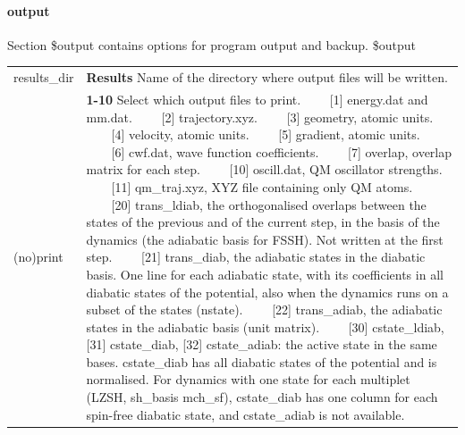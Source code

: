 \documentclass{report}
\newcommand{\tabitem}{~~\llap{--}~~}
\begin{document}
\paragraph{output}
Section \$output contains options for program output and backup. \newline
\$output

\begin{tabularx}{\textwidth}{ m{2.5cm} X }
results\_dir &
	\textbf{Results} \newline
	Name of the directory where output files will be written. \\

(no)print		&
	\textbf{1-10} \newline
	Select which output files to print. \newline
	\tabitem [1]   energy.dat and mm.dat. \newline
	\tabitem [2]   trajectory.xyz. \newline
	\tabitem [3]   geometry, atomic units. \newline
	\tabitem [4]   velocity, atomic units. \newline
	\tabitem [5]   gradient, atomic units. \newline
	\tabitem [6]   cwf.dat, wave function coefficients. \newline
	\tabitem [7]   overlap, overlap matrix for each step. \newline
	\tabitem [10]  oscill.dat, QM oscillator strengths. \newline
	\tabitem [11]  qm\_traj.xyz, XYZ file containing only QM atoms. \newline
	\tabitem [20]  trans\_ldiab, the orthogonalised overlaps between the states of the previous and of the current step, in the basis of the dynamics (the adiabatic basis for FSSH). Not written at the first step. \newline
	\tabitem [21]  trans\_diab, the adiabatic states in the diabatic basis. One line for each adiabatic state, with its coefficients in all diabatic states of the potential, also when the dynamics runs on a subset of the states (nstate). \newline
	\tabitem [22]  trans\_adiab, the adiabatic states in the adiabatic basis (unit matrix). \newline
	\tabitem [30]  cstate\_ldiab, [31] cstate\_diab, [32] cstate\_adiab: the active state in the same bases. cstate\_diab has all diabatic states of the potential and is normalised. For dynamics with one state for each multiplet (LZSH, sh\_basis mch\_sf), cstate\_diab has one column for each spin-free diabatic state, and cstate\_adiab is not available. \newline

\end{tabularx}
\end{document}
